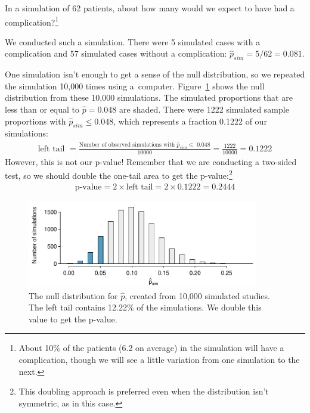 \begin{exercise}
In a simulation of 62 patients, about how many would we expect to have had a complication?\footnote{About 10\% of the patients (6.2 on average) in the simulation will have a complication, though we will see a little variation from one simulation to the next.}
\end{exercise}

We conducted such a simulation. There were 5 simulated cases with a complication and 57 simulated cases without a complication: $\hat{p}_{sim} = 5/62 = 0.081$.


One simulation isn't enough to get a sense of the null distribution, so we repeated the simulation 10,000 times using a~computer. Figure~\ref{MedConsNullSim} shows the null distribution from these 10,000 simulations. The simulated proportions that are less than or equal to $\hat{p}=0.048$ are shaded. There were 1222 simulated sample proportions with $\hat{p}_{sim} \leq 0.048$, which represents a fraction 0.1222 of our simulations:
\begin{align*}
\text{left tail }
	= \frac{\text{Number of observed simulations with }\hat{p}_{sim}\leq\text{ 0.048}}{10000}
	= \frac{1222}{10000} = 0.1222
\end{align*}
However, this is not our p-value! Remember that we are conducting a two-sided test, so we should double the one-tail area to get the p-value:\footnote{This doubling approach is preferred even when the distribution isn't symmetric, as in this case.}
\begin{align*}
\text{p-value} = 2 \times \text{left tail} = 2 \times 0.1222 = 0.2444
\end{align*}

\begin{figure}[ht]
\centering
\includegraphics[width=0.9\textwidth]{02/figures/MedicalConsultant/MedConsNullSim}
\caption{The null distribution for $\hat{p}$, created from 10,000 simulated studies. The left tail contains 12.22\% of the simulations. We double this value to get the p-value.}
\label{MedConsNullSim}
\end{figure}

